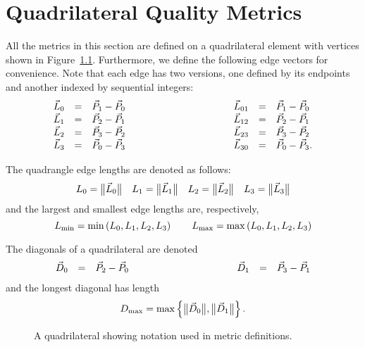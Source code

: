 \chapter{Quadrilateral Quality Metrics}

All the metrics in this section are defined on a quadrilateral element with vertices
shown in Figure~\ref{f:quad}. Furthermore, we define the following edge vectors for
convenience. Note that each edge has two versions, one defined by its endpoints and
another indexed by sequential integers:
\begin{equation*}
\begin{array}{lcl}
\vec L_0 &=& \vec P_1 - \vec P_0\\
\vec L_1 &=& \vec P_2 - \vec P_1\\
\vec L_2 &=& \vec P_3 - \vec P_2\\
\vec L_3 &=& \vec P_0 - \vec P_3
\end{array}\rule{10em}{0pt}
\begin{array}{lcl}
\vec L_{01} &=& \vec P_1 - \vec P_0\\
\vec L_{12} &=& \vec P_2 - \vec P_1\\
\vec L_{23} &=& \vec P_3 - \vec P_2\\
\vec L_{30} &=& \vec P_0 - \vec P_3.
\end{array}
\end{equation*}

The quadrangle edge lengths are denoted as follows:
\[
L_0 = \big\lVert{\vec L_0}\big\rVert\quad
L_1 = \big\lVert{\vec L_1}\big\rVert\quad
L_2 = \big\lVert{\vec L_2}\big\rVert\quad
L_3 = \big\lVert{\vec L_3}\big\rVert
\]
and the largest and smallest edge lengths are, respectively,
\[
L_{\min} = \min\left(L_0, L_1, L_2, L_3\right)
  \rule{2em}{0pt}
L_{\max} = \max\left(L_0, L_1, L_2, L_3\right)
\]

The diagonals of a quadrilateral are denoted
\begin{equation*}
\begin{array}{lcl}
\vec D_0 &=& \vec P_2 - \vec P_0
\end{array}\rule{10em}{0pt}
\begin{array}{lcl}
\vec D_1 &=& \vec P_3 - \vec P_1
\end{array}
\end{equation*}
and the longest diagonal has length
\[
D_{\max} = \max\left\{ \big\lVert{\vec D_0}\big\rVert, \big\lVert{\vec D_1}\big\rVert \right\}.
\]

\begin{figure}[htb]
  \centering
  \caption{A quadrilateral showing notation used in metric definitions.%
                                                                  \label{f:quad}}
\end{figure}

